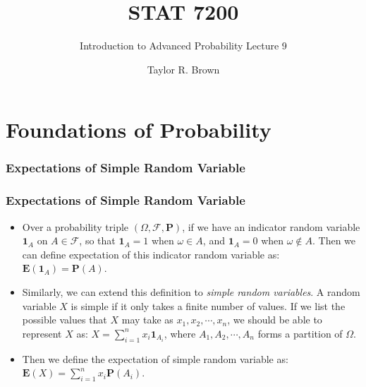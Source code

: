 \documentclass[handout]{beamer}
\title{STAT 7200}
\subtitle{Introduction to Advanced Probability \newline Lecture 9}
\author{Taylor R. Brown}
\institute{}
\date{}
\newcommand{\BP}{\mathbf{P}}
\newcommand{\BE}{\mathbf{E}}
\newcommand{\BI}{\mathbf{1}}
\begin{document}
\frame{\titlepage}

\section[Outline]{}



\section{Foundations of Probability}


\subsubsection{Expectations of Simple Random Variable}

\frame
{
  \frametitle{Expectations of Simple Random Variable}

   \begin{itemize}


                         \item<1-> Over a probability triple $(\Omega,\mathcal{F}, \BP)$, if we have an indicator random variable $\BI_A$ on $A\in \mathcal{F}$, so that $\BI_A=1$ when $\omega\in A$, and $\BI_A=0$ when $\omega \not \in A$. Then we can define expectation of this indicator random variable as: $\BE(\BI_A)=\BP(A)$.
                         
\item<2-> Similarly, we can extend this definition to \textit{simple random variables}. A  random variable $X$ is simple if it only takes a finite number of values. If we list the possible values that $X$ may take as $x_1, x_2,\cdots, x_n$, we should be able to represent $X$ as: $X=\sum_{i=1}^n x_i \BI_{A_i}$, where $A_1, A_2,\cdots, A_n$ forms a partition of $\Omega$. 
                                                  

\item<3-> Then we define the expectation of simple random variable as: $\BE(X)=\sum_{i=1}^n x_i \BP(A_i)$.

\end{itemize}
}
\end{document}
